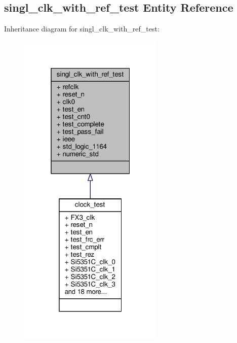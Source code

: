 \subsection{singl\+\_\+clk\+\_\+with\+\_\+ref\+\_\+test Entity Reference}
\label{classsingl__clk__with__ref__test}


Inheritance diagram for singl\+\_\+clk\+\_\+with\+\_\+ref\+\_\+test\+:\nopagebreak
\begin{figure}[H]
\begin{center}
\leavevmode
\includegraphics[width=196pt]{d8/ddf/classsingl__clk__with__ref__test__inherit__graph}
\end{center}
\end{figure}


